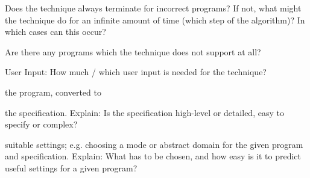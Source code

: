 \documentclass[a4paper]{article}
\begin{document}
\begin{minipage}[t]{0.16\linewidth}
\begin{betterlist}
\begin{betterlist}
\begin{betterlist}
				\item Does the technique always terminate for incorrect programs? If not, what might the technique do for an infinite amount of time (which step of the algorithm)? In which cases can this occur?

			\end{betterlist}
			\item Are there any programs which the technique does not support at all?

		\end{betterlist}
		\item \alert{User Input:} How much / which user input is needed for the technique?
		\begin{betterlist}
			\item \checkboxChecked the program, converted to

			\item \checkboxHalfChecked the specification. Explain: Is the specification high-level or detailed, easy to specify or complex?

			\item \checkboxUnchecked suitable settings; e.g. choosing a mode or abstract domain for the given program and specification. Explain: What has to be chosen, and how easy is it to predict useful settings for a given program?


\end{betterlist}
\end{betterlist}
\end{minipage}
\end{document}
